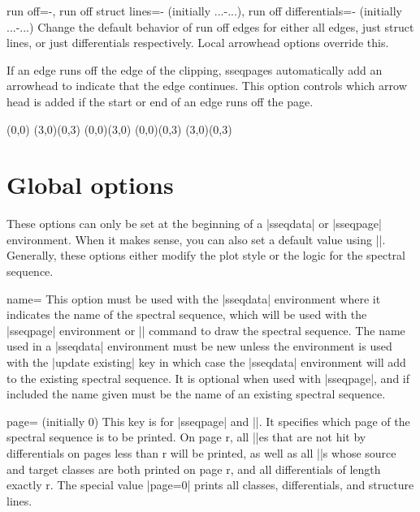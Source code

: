 \documentclass{ltxdoc}
\begin{document}
\begin{sseqdata}[name=ex1,degree={#1}{1-#1}]
\begin{keylist}{run off=-,
    run off struct lines=-  (initially {...-...}),
    run off differentials=- (initially {...-...})}
Change the default behavior of run off edges for either all edges, just struct lines, or just differentials respectively. Local arrowhead options override this.

If an edge runs off the edge of the clipping, sseqpages automatically add an arrowhead to indicate that the edge continues. This option controls which arrow head is added if the start or end of an edge runs off the page.
\begin{codeexample}[width=6cm]
\begin{sseqpage}[x range={0}{2},y range={0}{2},
                 draw orphan edges,run off=>-stealth]
\class(0,0)
\class(3,0)\class(0,3)
\structline(0,0)(3,0)
\structline[red](0,0)(0,3)
\structline[blue](3,0)(0,3)
\end{sseqpage}
\end{codeexample}
\end{keylist}


\section{Global options}
These options can only be set at the beginning of a |sseqdata| or |sseqpage| environment. When it makes sense, you can also set a default value using |\sseqset|. Generally, these options either modify the plot style or the logic for the spectral sequence.
\begin{key}{name=}
This option must be used with the |sseqdata| environment where it indicates the name of the spectral sequence, which will be used with the |sseqpage| environment or |\printpage| command to draw the spectral sequence. The name used in a |sseqdata| environment must be new unless the environment is used with the |update existing| key in which case the |sseqdata| environment will add to the existing spectral sequence. It is optional when used with |sseqpage|, and if included the name given must be the name of an existing spectral sequence.
\end{key}

\begin{key}{page= (initially 0)}
This key is for |sseqpage| and |\printpage|. It specifies which page of the spectral sequence is to be printed. On page r, all |\class|es that are not hit by differentials on pages less than r will be printed, as well as all |\structline|s whose source and target classes are both printed on page r, and all differentials of length exactly r. The special value |page=0| prints all classes, differentials, and structure lines.
\end{key}


\end{sseqdata}
\end{document}
